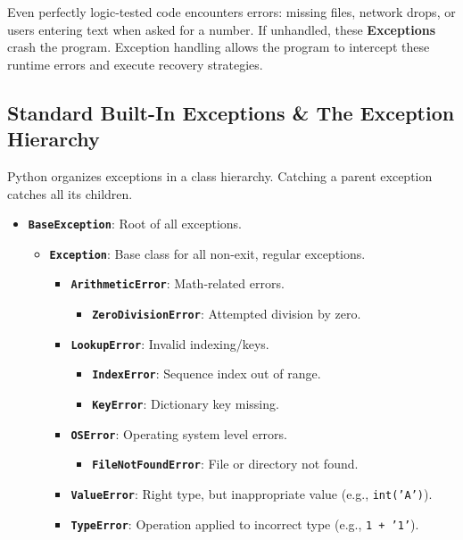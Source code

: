 Even perfectly logic-tested code encounters errors: missing files, network drops, or users entering text when asked for a number. If unhandled, these \textbf{Exceptions} crash the program. Exception handling allows the program to intercept these runtime errors and execute recovery strategies.

\subsection{Standard Built-In Exceptions \& The Exception Hierarchy}

Python organizes exceptions in a class hierarchy. Catching a parent exception catches all its children.

\begin{conceptbox}
\begin{itemize}[leftmargin=1.5em]
    \item \textbf{\texttt{BaseException}}: Root of all exceptions.
    \begin{itemize}
        \item \textbf{\texttt{Exception}}: Base class for all non-exit, regular exceptions.
        \begin{itemize}
            \item \textbf{\texttt{ArithmeticError}}: Math-related errors.
            \begin{itemize}
                \item \textbf{\texttt{ZeroDivisionError}}: Attempted division by zero.
            \end{itemize}
            \item \textbf{\texttt{LookupError}}: Invalid indexing/keys.
            \begin{itemize}
                \item \textbf{\texttt{IndexError}}: Sequence index out of range.
                \item \textbf{\texttt{KeyError}}: Dictionary key missing.
            \end{itemize}
            \item \textbf{\texttt{OSError}}: Operating system level errors.
            \begin{itemize}
                \item \textbf{\texttt{FileNotFoundError}}: File or directory not found.
            \end{itemize}
            \item \textbf{\texttt{ValueError}}: Right type, but inappropriate value (e.g., \texttt{int('A')}).
            \item \textbf{\texttt{TypeError}}: Operation applied to incorrect type (e.g., \texttt{1 + '1'}).
        \end{itemize}
    \end{itemize}
\end{itemize}
\end{conceptbox}

